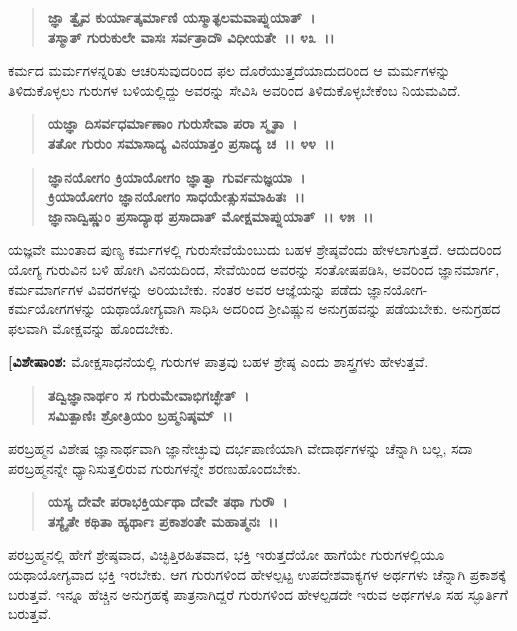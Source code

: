 \begin{verse}
\textbf{ಜ್ಞಾ ತ್ವೈವ ಕುರ್ಯಾತ್ಕರ್ಮಾಣಿ ಯಸ್ಮಾತ್ಫಲಮವಾಪ್ನುಯಾತ್~।}\\\textbf{ತಸ್ಮಾತ್ ಗುರುಕುಲೇ ವಾಸಃ ಸರ್ವತ್ರಾದೌ ವಿಧೀಯತೇ~।। ೪೩~।।}
\end{verse}

ಕರ್ಮದ ಮರ್ಮಗಳನ್ನರಿತು ಆಚರಿಸುವುದರಿಂದ ಫಲ ದೊರೆಯುತ್ತದೆಯಾದುದರಿಂದ ಆ ಮರ್ಮಗಳನ್ನು ತಿಳಿದುಕೊಳ್ಳಲು ಗುರುಗಳ ಬಳಿಯಲ್ಲಿದ್ದು ಅವರನ್ನು ಸೇವಿಸಿ ಅವರಿಂದ ತಿಳಿದುಕೊಳ್ಳಬೇಕೆಂಬ ನಿಯಮವಿದೆ.

\begin{verse}
\textbf{ಯಜ್ಞಾ ದಿಸರ್ವಧರ್ಮಾಣಾಂ ಗುರುಸೇವಾ ಪರಾ ಸ್ಮೃತಾ~।}\\\textbf{ತತೋ ಗುರುಂ ಸಮಾಸಾದ್ಯ ವಿನಯಾತ್ತಂ ಪ್ರಸಾದ್ಯ ಚ~।। ೪೪~।। }
\end{verse}

\begin{verse}
\textbf{ಜ್ಞಾನಯೋಗಂ ಕ್ರಿಯಾಯೋಗಂ ಜ್ಞಾತ್ವಾ ಗುರ್ವನುಜ್ಞಯಾ~।}\\\textbf{ಕ್ರಿಯಾಯೋಗಂ ಜ್ಞಾನಯೋಗಂ ಸಾಧಯೇತ್ಸುಸಮಾಹಿತಃ~।।}\\\textbf{ಜ್ಞಾನಾದ್ವಿಷ್ಣುಂ ಪ್ರಸಾದ್ಯಾಥ ಪ್ರಸಾದಾತ್ ಮೋಕ್ಷಮಾಪ್ನುಯಾತ್~।। ೪೫~।।}
\end{verse}

ಯಜ್ಞವೇ ಮುಂತಾದ ಪುಣ್ಯ ಕರ್ಮಗಳಲ್ಲಿ ಗುರುಸೇವೆಯೆಂಬುದು ಬಹಳ ಶ್ರೇಷ್ಠವೆಂದು ಹೇಳಲಾಗುತ್ತದೆ. ಆದುದರಿಂದ ಯೋಗ್ಯ ಗುರುವಿನ ಬಳಿ ಹೋಗಿ ವಿನಯದಿಂದ, ಸೇವೆಯಿಂದ ಅವರನ್ನು ಸಂತೋಷಪಡಿಸಿ, ಅವರಿಂದ ಜ್ಞಾನಮಾರ್ಗ, ಕರ್ಮಮಾರ್ಗಗಳ ವಿವರಗಳನ್ನು ಅರಿಯಬೇಕು. ನಂತರ ಅವರ ಆಜ್ಞೆಯನ್ನು ಪಡೆದು ಜ್ಞಾನಯೋಗ-ಕರ್ಮಯೋಗಗಳನ್ನು ಯಥಾಯೋಗ್ಯವಾಗಿ ಸಾಧಿಸಿ ಅದರಿಂದ ಶ‍್ರೀವಿಷ್ಣುನ ಅನುಗ್ರಹವನ್ನು ಪಡೆಯಬೇಕು. ಅನುಗ್ರಹದ ಫಲವಾಗಿ ಮೋಕ್ಷವನ್ನು ಹೊಂದಬೇಕು.

\textbf{[ವಿಶೇಷಾಂಶ: }ಮೋಕ್ಷಸಾಧನೆಯಲ್ಲಿ ಗುರುಗಳ ಪಾತ್ರವು ಬಹಳ ಶ್ರೇಷ್ಠ ಎಂದು ಶಾಸ್ತ್ರಗಳು ಹೇಳುತ್ತವೆ.

\begin{verse}
\textbf{ತದ್ವಿಜ್ಞಾನಾರ್ಥಂ ಸ ಗುರುಮೇವಾಭಿಗಚ್ಛೇತ್~।}\\\textbf{ಸಮಿತ್ಪಾಣಿಃ ಶ್ರೋತ್ರಿಯಂ ಬ್ರಹ್ಮನಿಷ್ಠಮ್~।।} 
\end{verse}

ಪರಬ್ರಹ್ಮನ ವಿಶೇಷ ಜ್ಞಾನಾರ್ಥವಾಗಿ ಜ್ಞಾನೇಚ್ಛುವು ದರ್ಭಪಾಣಿಯಾಗಿ ವೇದಾರ್ಥಗಳನ್ನು ಚೆನ್ನಾಗಿ ಬಲ್ಲ, ಸದಾ ಪರಬ್ರಹ್ಮನನ್ನೇ ಧ್ಯಾನಿಸುತ್ತಲಿರುವ ಗುರುಗಳನ್ನೇ ಶರಣುಹೊಂದಬೇಕು.

\begin{verse}
\textbf{ಯಸ್ಯ ದೇವೇ ಪರಾಭಕ್ತಿರ್ಯಥಾ ದೇವೇ ತಥಾ ಗುರೌ~।}\\\textbf{ತಸ್ಯೈತೇ ಕಥಿತಾ ಹ್ಯರ್ಥಾಃ ಪ್ರಕಾಶಂತೇ ಮಹಾತ್ಮನಃ~।।} 
\end{verse}

ಪರಬ್ರಹ್ಮನಲ್ಲಿ ಹೇಗೆ ಶ್ರೇಷ್ಠವಾದ, ವಿಚ್ಛಿತ್ತಿರಹಿತವಾದ, ಭಕ್ತಿ ಇರುತ್ತದೆಯೋ ಹಾಗೆಯೇ ಗುರುಗಳಲ್ಲಿಯೂ ಯಥಾಯೋಗ್ಯವಾದ ಭಕ್ತಿ ಇರಬೇಕು. ಆಗ ಗುರುಗಳಿಂದ ಹೇಳಲ್ಪಟ್ಟ ಉಪದೇಶವಾಕ್ಯಗಳ ಅರ್ಥಗಳು ಚೆನ್ನಾಗಿ ಪ್ರಕಾಶಕ್ಕೆ ಬರುತ್ತವೆ. ಇನ್ನೂ ಹೆಚ್ಚಿನ ಅನುಗ್ರಹಕ್ಕೆ ಪಾತ್ರನಾಗಿದ್ದರೆ ಗುರುಗಳಿಂದ ಹೇಳಲ್ಪಡದೇ ಇರುವ ಅರ್ಥಗಳೂ ಸಹ ಸ್ಫೂರ್ತಿಗೆ ಬರುತ್ತವೆ.

